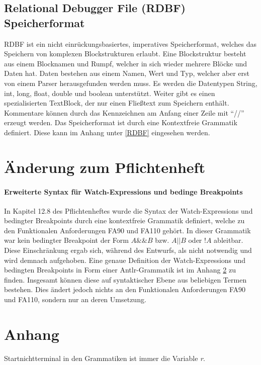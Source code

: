 \documentclass[parskip=full]{scrartcl}
\begin{document}
\subsection{Relational Debugger File (RDBF) Speicherformat}
RDBF ist ein nicht einrückungsbasiertes, imperatives Speicherformat, welches das Speichern von komplexen Blockstrukturen erlaubt.
Eine Blockstruktur besteht aus einem Blocknamen und Rumpf, welcher in sich wieder mehrere Blöcke und Daten hat.
Daten bestehen aus einem Namen, Wert und Typ, welcher aber erst von einem Parser herausgefunden werden muss.
Es werden die Datentypen String, int, long, float, double und boolean unterstützt.
Weiter gibt es einen spezialisierten TextBlock, der nur einen Fließtext zum Speichern enthält.
Kommentare können durch das Kennzeichnen am Anfang einer Zeile mit \enquote{//} erzeugt werden.
Das Speicherformat ist durch eine Kontextfreie Grammatik definiert. 
Diese kann im Anhang unter \ref{RDBF} eingesehen werden. 

\newpage
\section{Änderung zum Pflichtenheft}
\paragraph{Erweiterte Syntax für Watch-Expressions und bedinge Breakpoints}
In Kapitel 12.8 des Pflichtenheftes wurde die Syntax der Watch-Expressions und bedingter Breakpoints durch eine kontextfreie Grammatik definiert, welche zu den Funktionalen Anforderungen FA90 und FA110 gehört.
In dieser Grammatik war kein bedingter Breakpoint der Form $A\&\&B$ bzw. $A||B$ oder $!A$ ableitbar. 
Diese Einschränkung ergab sich, während des Entwurfs, als nicht notwendig und wird demnach aufgehoben. 
Eine genaue Definition der Watch-Expressions und bedingten Breakpoints in Form einer Antlr-Grammatik ist im Anhang \ref{Anhang} zu finden. 
Insgesamt können diese auf syntaktischer Ebene aus beliebigen Termen bestehen. 
Dies ändert jedoch nichts an den Funktionalen Anforderungen FA90 und FA110, sondern nur an deren Umsetzung.



\newpage
\section{Anhang}
\label{Anhang}

Startnichtterminal in den Grammatiken ist immer die Variable \textit{r}.
\end{document}
